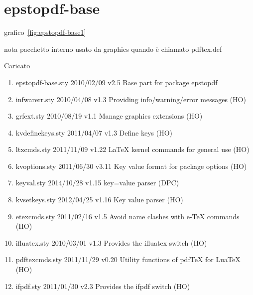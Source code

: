 \section{epstopdf-base}

grafico~\vref{fig:epstopdf-base1}

nota pacchetto interno usato da graphics quando è chiamato pdftex.def

Caricato 
\begin{enumerate}
\item epstopdf-base.sty 2010/02/09 v2.5 Base part for package epstopdf
\item infwarerr.sty 2010/04/08 v1.3 Providing info/warning/error messages (HO)
\item grfext.sty 2010/08/19 v1.1 Manage graphics extensions (HO)
\item kvdefinekeys.sty 2011/04/07 v1.3 Define keys (HO)
\item ltxcmds.sty 2011/11/09 v1.22 LaTeX kernel commands for general use (HO)
\item kvoptions.sty 2011/06/30 v3.11 Key value format for package options (HO)
\item keyval.sty 2014/10/28 v1.15 key=value parser (DPC)
\item kvsetkeys.sty 2012/04/25 v1.16 Key value parser (HO)
\item etexcmds.sty 2011/02/16 v1.5 Avoid name clashes with e-TeX commands (HO)
\item ifluatex.sty 2010/03/01 v1.3 Provides the ifluatex switch (HO)
\item pdftexcmds.sty 2011/11/29 v0.20 Utility functions of pdfTeX for LuaTeX (HO)
\item ifpdf.sty 2011/01/30 v2.3 Provides the ifpdf switch (HO)
\end{enumerate}	
